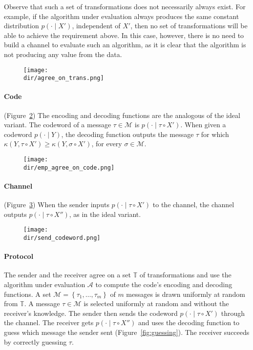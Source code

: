Observe that such a set of transformations does not necessarily always exist. For example, if the algorithm under evaluation always produces the same constant distribution $p(\cdot \mid X')$, independent of $X'$, then no set of transformations will be able to achieve the requirement above. In this case, however, there is no need to build a channel to evaluate such an algorithm, as it is clear that the algorithm is not producing any value from the data.

\begin{figure}
\texttt{[image: \\dir/agree\_on\_trans.png]}
\caption{}
\label{fig:agree_on_trans}
\end{figure}

\paragraph{Code} (Figure~\ref{fig:emp_agree_on_code}) The encoding and decoding functions are the analogous of the ideal variant. The codeword of a message $\tau \in \mathcal{M}$ is $p(\cdot \mid \tau \circ X')$. When given a codeword $p(\cdot \mid Y)$, the decoding function outputs the message $\tau$ for which $\kappa\left(Y, \tau \circ X'\right) \geq \kappa\left(Y, \sigma \circ X'\right)$, for every $\sigma \in \mathcal{M}$.

\begin{figure}
\texttt{[image: \\dir/emp\_agree\_on\_code.png]}
\caption{}
\label{fig:emp_agree_on_code}
\end{figure}

\paragraph{Channel} (Figure~\ref{fig:send_codeword}) When the sender inputs $p(\cdot \mid \tau \circ X')$ to the channel, the channel outputs $p(\cdot \mid \tau \circ X'')$, as in the ideal variant.

\begin{figure}
\texttt{[image: \\dir/send\_codeword.png]}
\caption{}
\label{fig:send_codeword}
\end{figure}

\paragraph{Protocol} The sender and the receiver agree on a set $\mathbb{T}$ of transformations and use the algorithm under evaluation $\mathcal{A}$ to compute the code's encoding and decoding functions. A set $\mathcal{M} = \left\{\tau_1, \ldots, \tau_m\right\}$ of $m$ messages is drawn uniformly at random from $\mathbb{T}$. A message $\tau \in \mathcal{M}$ is selected uniformly at random and without the receiver's knowledge. The sender then sends the codeword $p(\cdot \mid \tau \circ X')$ through the channel. The receiver gets $p(\cdot \mid \tau \circ X'')$ and uses the decoding function to guess which message the sender sent (Figure~\ref{fig:guessing}). The receiver succeeds by correctly guessing $\tau$.

